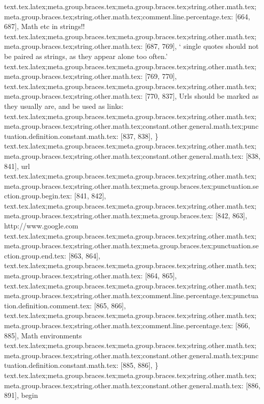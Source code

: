 {{{{{{{{{{{{{{{{{{{{{{{{text.tex.latex;meta.group.braces.tex;meta.group.braces.tex;string.other.math.tex;meta.group.braces.tex;string.other.math.tex;comment.line.percentage.tex: [664, 687], { Math etc in strings!!
}
text.tex.latex;meta.group.braces.tex;meta.group.braces.tex;string.other.math.tex;meta.group.braces.tex;string.other.math.tex: [687, 769], {` single quotes should not be paired as strings, as they appear alone too often.'
}
text.tex.latex;meta.group.braces.tex;meta.group.braces.tex;string.other.math.tex;meta.group.braces.tex;string.other.math.tex: [769, 770], {
}
text.tex.latex;meta.group.braces.tex;meta.group.braces.tex;string.other.math.tex;meta.group.braces.tex;string.other.math.tex: [770, 837], {Urls should be marked as they usually are, and be used as links:   }
text.tex.latex;meta.group.braces.tex;meta.group.braces.tex;string.other.math.tex;meta.group.braces.tex;string.other.math.tex;constant.other.general.math.tex;punctuation.definition.constant.math.tex: [837, 838], {\}
text.tex.latex;meta.group.braces.tex;meta.group.braces.tex;string.other.math.tex;meta.group.braces.tex;string.other.math.tex;constant.other.general.math.tex: [838, 841], {url}
text.tex.latex;meta.group.braces.tex;meta.group.braces.tex;string.other.math.tex;meta.group.braces.tex;string.other.math.tex;meta.group.braces.tex;punctuation.section.group.begin.tex: [841, 842], {{}
text.tex.latex;meta.group.braces.tex;meta.group.braces.tex;string.other.math.tex;meta.group.braces.tex;string.other.math.tex;meta.group.braces.tex: [842, 863], {http://www.google.com}
text.tex.latex;meta.group.braces.tex;meta.group.braces.tex;string.other.math.tex;meta.group.braces.tex;string.other.math.tex;meta.group.braces.tex;punctuation.section.group.end.tex: [863, 864], {}}
text.tex.latex;meta.group.braces.tex;meta.group.braces.tex;string.other.math.tex;meta.group.braces.tex;string.other.math.tex: [864, 865], {
}
text.tex.latex;meta.group.braces.tex;meta.group.braces.tex;string.other.math.tex;meta.group.braces.tex;string.other.math.tex;comment.line.percentage.tex;punctuation.definition.comment.tex: [865, 866], {%
text.tex.latex;meta.group.braces.tex;meta.group.braces.tex;string.other.math.tex;meta.group.braces.tex;string.other.math.tex;comment.line.percentage.tex: [866, 885], { Math environments
}
text.tex.latex;meta.group.braces.tex;meta.group.braces.tex;string.other.math.tex;meta.group.braces.tex;string.other.math.tex;constant.other.general.math.tex;punctuation.definition.constant.math.tex: [885, 886], {\}
text.tex.latex;meta.group.braces.tex;meta.group.braces.tex;string.other.math.tex;meta.group.braces.tex;string.other.math.tex;constant.other.general.math.tex: [886, 891], {begin}
}}}}}}}}}}}}}}}}}}}}}}}}}}}
